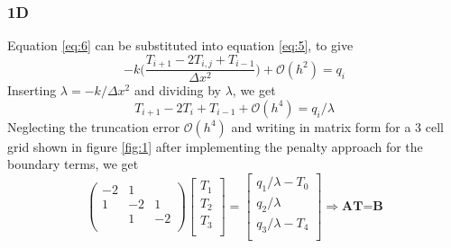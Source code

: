 \documentclass[12pt]{amsart}   %
\begin{document}
\subsubsection{1D} Equation \ref{eq:6} can be substituted into equation \ref{eq:5}, to give
\begin{equation}
-k \Bigg(\frac{T_{i+1} -2T_{i,j} + T_{i-1}}{\Delta x^2} \Bigg)+\mathcal{O}(h^2) = q_i
\end{equation}
Inserting $\lambda = -k/\Delta x^2$ and dividing by $\lambda$, we get
\begin{equation}
{T_{i+1} -2T_{i} + T_{i-1}} +\mathcal{O}(h^4) = q_i/\lambda
\end{equation}
Neglecting the truncation error $\mathcal{O}(h^4)$ and writing in matrix form for a 3 cell grid shown in figure \ref{fig:1} after implementing the penalty approach for the boundary terms, we get
\begin{equation}
 \begin{pmatrix}
-2 & 1 &  \\
1 & -2 & 1 \\
 & 1 & -2 \\
\end{pmatrix} \begin{bmatrix}
T_{1}\\
T_{2}\\
T_{3}\\
\end{bmatrix} =
\begin{bmatrix}
{q_{1}}/{\lambda}-T_{0}\\
{q_{2}}/{\lambda}\\
{q_{3}}/{\lambda}-T_{4}\\
\end{bmatrix} \Rightarrow \textbf{AT=B}
\end{equation}
\end{document}
